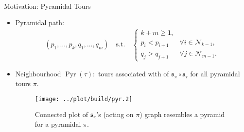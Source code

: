 \documentclass[
  size=10pt,
  style=klope,
  paper=screen,
  pauseslide,
  nopagebreaks,
  fleqn
]{powerdot}
\def\eqitspace{\vspace{-5mm}}
\begin{document}
\begin{slide}[toc=Pyramidal Tours]{Motivation: Pyramidal Tours}
\begin{itemize}
  \item
  Pyramidal path:
  \begin{align}
  \left( p_1, \ldots, p_k, q_1, \ldots, q_m \right) \quad \text{s.t.} \quad
  \begin{cases}
  k+m \geq 1, & \\
  p_i < p_{i+1} \; & \forall i \in \mathcal{N}_{k-1},\\
  q_j > q_{j+1} \; & \forall j \in \mathcal{N}_{m-1}.
  \end{cases}
  \end{align}
  \item
  Neighbourhood $\operatorname{Pyr}\left(\tau\right):$
  tours associated with of $\mathfrak{s}_\pi \circ \mathfrak{s}_\tau$
  for all pyramidal tours $\pi$.
  \begin{figure}[H]
    \centering
    \texttt{[image: ../plot/build/pyr.2]}
    \caption{%
      Connected plot of $\mathfrak{s}_\pi$'s
      (acting on $\pi$)
      graph resembles a pyramid
      for a pyramidal $\pi$.
    }
  \end{figure}
\end{itemize}
\end{slide}
\end{document}
